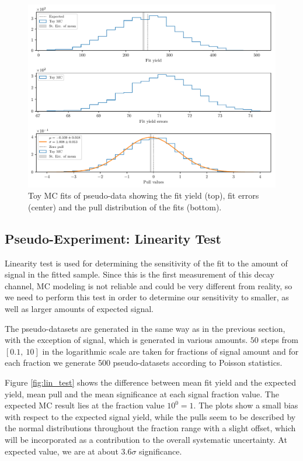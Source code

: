 \begin{figure}[H]
	\centering
	\captionsetup{width=0.8\linewidth}
	\includegraphics[width=\linewidth]{fig/toyMC}
	\caption{Toy MC fits of pseudo-data showing the fit yield (top), fit errors (center) and the pull distribution of the fits (bottom).}
	\label{fig:toyMC}
\end{figure}

\subsection{Pseudo-Experiment: Linearity Test}
\label{sec:pseudo-experiment-linearity-test}
Linearity test is used for determining the sensitivity of the fit to the amount of signal in the fitted sample. Since this is the first measurement of this decay channel, MC modeling is not reliable and could be very different from reality, so we need to perform this test in order to determine our sensitivity to smaller, as well as larger amounts of expected signal.

The pseudo-datasets are generated in the same way as in the previous section, with the exception of signal, which is generated in various amounts. $50$ steps from $[0.1,~10]$ in the logarithmic scale are taken for fractions of signal amount and for each fraction we generate 500 pseudo-datasets according to Poisson statistics.

Figure \ref{fig:lin_test} shows the difference between mean fit yield and the expected yield, mean pull and the mean significance at each signal fraction value. The expected MC result lies at the fraction value $10^0 = 1$. The plots show a small bias with respect to the expected signal yield, while the pulls seem to be described by the normal distributions throughout the fraction range with a slight offset, which will be incorporated as a contribution to the overall systematic uncertainty. At expected value, we are at about $3.6\sigma$ significance.

